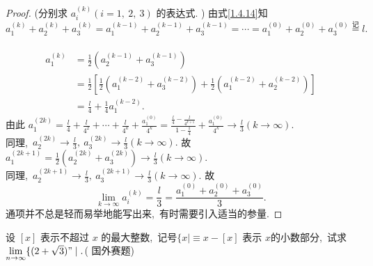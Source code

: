 \begin{proof}
	(分别求 $ a_{i}^{(k)}(i=1,\ 2,\ 3) $ 的表达式. ) 由式\eqref{1.4.14}知
	$$a_{1}^{(k)}+a_{2}^{(k)}+a_{3}^{(k)}=a_{1}^{(k-1)}+a_{2}^{(k-1)}+a_{3}^{(k-1)}=\cdots=a_{1}^{(0)}+a_{2}^{(0)}+a_{3}^{(0)} \stackrel{\text{记}}{=} l .$$
	\\
	$$\begin{aligned}
		a_1^{(k)}&=\frac{1}{2}(a_2^{(k-1)}+a_3^{(k-1)})\\
		&=\frac{1}{2}\left[\frac{1}{2}(a_1^{(k-2)}+a_3^{(k-2)})+\frac{1}{2}(a_1^{(k-2)}+a_2^{(k-2)})\right]\\
		&=\frac{l}{4}+\frac{1}{4}a_1^{(k-2)}.
	\end{aligned}$$
	由此 $ a_{1}^{(2 k)}=\frac{l}{4}+\frac{l}{4^{2}}+\cdots+\frac{l}{4^{k}}+\frac{a_{1}^{(0)}}{4^{k}}=\frac{\frac{l}{4}-\frac{l}{4^{k+1}}}{1-\frac{1}{4}}+\frac{a_{1}^{(0)}}{4^{k}} \rightarrow \frac{l}{3}(k \rightarrow \infty) .$\\
	同理,\  $ a_{2}^{(2 k)} \rightarrow \frac{l}{3},\  a_{3}^{(2 k)} \rightarrow \frac{l}{3}(k \rightarrow \infty) .$ 故 $ a_{1}^{(2 k+1)}=\frac{1}{2}\left(a_{2}^{(2 k)}+a_{3}^{(2 k)}\right) \rightarrow \frac{l}{3}(k \rightarrow \infty) .$\\
	同理,\  $ a_{2}^{(2 k+1)} \rightarrow \frac{l}{3},\  a_{3}^{(2 k+1)} \rightarrow \frac{l}{3}(k \rightarrow \infty) .$ 故
	$$\lim\limits_{k \rightarrow \infty} a_{i}^{(k)}=\frac{l}{3}=\frac{a_{1}^{(0)}+a_{2}^{(0)}+a_{3}^{(0)}}{3} .$$
	通项并不总是轻而易举地能写出来,\  有时需要引入适当的参量.
\end{proof}
\newpage
\begin{problem}
	设 $ [x] $ 表示不超过  $x $ 的最大整数,\  记号$  \{x \mid \equiv x-[x] $ 表示 $ x  $的小数部分,\  试求 $ \lim\limits_{n \rightarrow \infty}\{(2+\sqrt{3}) " \mid . $( 国外赛题)
\end{problem}
